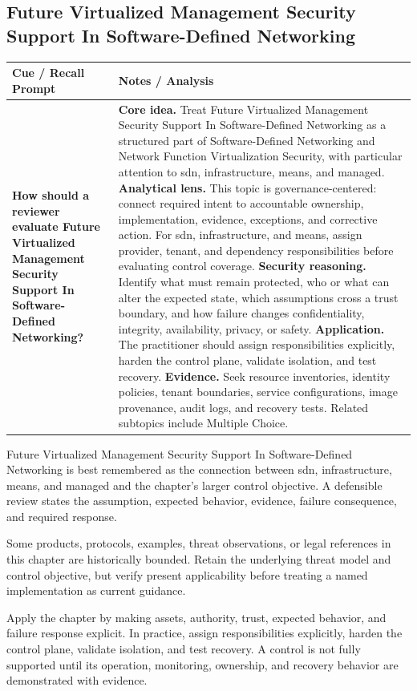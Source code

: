 \documentclass[11pt]{article}
\newcommand{\CornellHeader}{%
\rowcolor{Navy}\color{white}\bfseries Cue / Recall Prompt & \color{white}\bfseries Notes / Analysis\\\hline}
\newcommand{\CornellRow}[2]{%
\cellcolor{CueGray}\RaggedRight\textbf{#1} & \RaggedRight #2\\\hline}
\begin{document}
\subsection*{Future Virtualized Management Security Support In Software-Defined Networking}
\begin{longtable}{>{\RaggedRight\arraybackslash}p{}|>{\RaggedRight\arraybackslash}p{}}
\CornellHeader
\CornellRow{How should a reviewer evaluate Future Virtualized Management Security Support In Software-Defined Networking?}{\textbf{Core idea.} Treat Future Virtualized Management Security Support In Software-Defined Networking as a structured part of Software-Defined Networking and Network Function Virtualization Security, with particular attention to sdn, infrastructure, means, and managed. \textbf{Analytical lens.} This topic is governance-centered: connect required intent to accountable ownership, implementation, evidence, exceptions, and corrective action. For sdn, infrastructure, and means, assign provider, tenant, and dependency responsibilities before evaluating control coverage. \textbf{Security reasoning.} Identify what must remain protected, who or what can alter the expected state, which assumptions cross a trust boundary, and how failure changes confidentiality, integrity, availability, privacy, or safety. \textbf{Application.} The practitioner should assign responsibilities explicitly, harden the control plane, validate isolation, and test recovery. \textbf{Evidence.} Seek resource inventories, identity policies, tenant boundaries, service configurations, image provenance, audit logs, and recovery tests. Related subtopics include Multiple Choice.}
\end{longtable}
\begin{topicsummary}
Future Virtualized Management Security Support In Software-Defined Networking is best remembered as the connection between sdn, infrastructure, means, and managed and the chapter's larger control objective. A defensible review states the assumption, expected behavior, evidence, failure consequence, and required response.
\end{topicsummary}
\begin{historybox}
Some products, protocols, examples, threat observations, or legal references in this chapter are historically bounded. Retain the underlying threat model and control objective, but verify present applicability before treating a named implementation as current guidance.
\end{historybox}
\begin{defensebox}
Apply the chapter by making assets, authority, trust, expected behavior, and failure response explicit. In practice, assign responsibilities explicitly, harden the control plane, validate isolation, and test recovery. A control is not fully supported until its operation, monitoring, ownership, and recovery behavior are demonstrated with evidence.
\end{defensebox}
\end{document}
